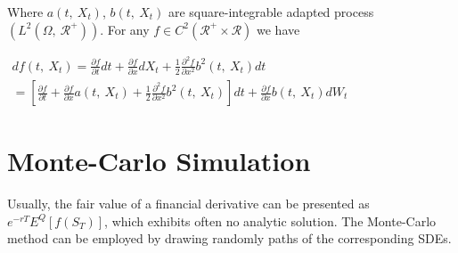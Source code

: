 \documentclass{article}
\begin{document}
Where $a\left( t,\  X_{t}\right) $, $b\left( t,\  X_{t}\right)  $ are square-integrable adapted process $\left( L^{2}\left( \Omega ,\  \mathscr{R}^{+} \right)  \right).$ For any $f\in C^{2}\left( \mathscr{R}^{+} \times \mathscr{R}\right)  $  we have
\begin{center}
	$\begin{array}{c}df\left( t,\  X_{t}\right)  =\frac{\partial f}{\partial t} dt+\frac{\partial f}{\partial x} dX_{t}+\frac{1}{2} \frac{\partial^{2} f}{\partial x^{2}} b^{2}\left( t,\  X_{t}\right)  dt\\ =\left[ \frac{\partial f}{\partial t} +\frac{\partial f}{\partial x} a\left( t,\  X_{t}\right)  +\frac{1}{2} \frac{\partial^{2} f}{\partial x^{2}} b^{2}(t,\  X_{t})\right]  dt+\frac{\partial f}{\partial x} b\left( t,\  X_{t}\right)  dW_{t}\end{array} $
\end{center}

\section{Monte-Carlo Simulation}
Usually, the fair value of a financial derivative can be presented as $e^{-rT}E^{Q}\left[ f\left( S_{T}\right)  \right]$, which exhibits often no analytic solution. The Monte-Carlo method can be employed by drawing randomly paths of the corresponding SDEs.
\end{document}
